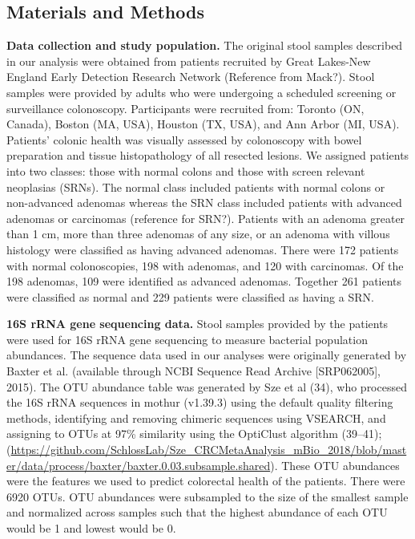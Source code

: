 \documentclass[11pt,]{article}
\begin{document}
\subsection{Materials and Methods}\label{materials-and-methods}

\textbf{Data collection and study population.} The original stool
samples described in our analysis were obtained from patients recruited
by Great Lakes-New England Early Detection Research Network (Reference
from Mack?). Stool samples were provided by adults who were undergoing a
scheduled screening or surveillance colonoscopy. Participants were
recruited from: Toronto (ON, Canada), Boston (MA, USA), Houston (TX,
USA), and Ann Arbor (MI, USA). Patients' colonic health was visually
assessed by colonoscopy with bowel preparation and tissue histopathology
of all resected lesions. We assigned patients into two classes: those
with normal colons and those with screen relevant neoplasias (SRNs). The
normal class included patients with normal colons or non-advanced
adenomas whereas the SRN class included patients with advanced adenomas
or carcinomas (reference for SRN?). Patients with an adenoma greater
than 1 cm, more than three adenomas of any size, or an adenoma with
villous histology were classified as having advanced adenomas. There
were 172 patients with normal colonoscopies, 198 with adenomas, and 120
with carcinomas. Of the 198 adenomas, 109 were identified as advanced
adenomas. Together 261 patients were classified as normal and 229
patients were classified as having a SRN.

\textbf{16S rRNA gene sequencing data.} Stool samples provided by the
patients were used for 16S rRNA gene sequencing to measure bacterial
population abundances. The sequence data used in our analyses were
originally generated by Baxter et al. (available through NCBI Sequence
Read Archive {[}SRP062005{]}, 2015). The OTU abundance table was
generated by Sze et al (34), who processed the 16S rRNA sequences in
mothur (v1.39.3) using the default quality filtering methods,
identifying and removing chimeric sequences using VSEARCH, and assigning
to OTUs at 97\% similarity using the OptiClust algorithm (39--41);
(\url{https://github.com/SchlossLab/Sze_CRCMetaAnalysis_mBio_2018/blob/master/data/process/baxter/baxter.0.03.subsample.shared}).
These OTU abundances were the features we used to predict colorectal
health of the patients. There were 6920 OTUs. OTU abundances were
subsampled to the size of the smallest sample and normalized across
samples such that the highest abundance of each OTU would be 1 and
lowest would be 0.
\end{document}
